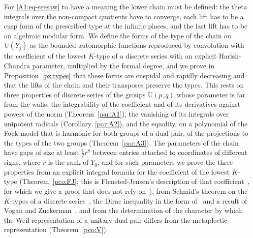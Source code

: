 \documentclass[10pt]{amsart}
\theoremstyle{definition}
\theoremstyle{remark}
\providecommand{\auU}{\mathrm U}
\begin{document}
For \eqref{A1:eq-seesaw} to have a meaning the lower chain must be defined: the theta integrals
over the non-compact quotients have to converge, each lift has to be a cusp form of the prescribed
type at the infinite places, and the last lift has to be an algebraic modular form. We define the
forms of the type of the chain on $\auU(Y_j)$ as the bounded automorphic functions reproduced by
convolution with the coefficient of the lowest $K$-type of a discrete series with an explicit
Harish-Chandra parameter, multiplied by the formal degree, and we prove in
Proposition~\ref{pz:types} that these forms are cuspidal and rapidly decreasing and that the
lifts of the chain and their transposes preserve the types. This rests on three properties of
discrete series of the groups $\auU(p,q)$ whose parameter is far from the walls: the integrability
of the coefficient and of its derivatives against powers of the norm (Theorem~\ref{par:A1}), the
vanishing of its integrals over unipotent radicals (Corollary~\ref{par:A2}), and the equality, on
a polynomial of the Fock model that is harmonic for both groups of a dual pair, of the projections
to the types of the two groups (Theorem~\ref{par:A3}). The parameters of the chain have gaps of size at least $\tfrac12r^8$
between entries attached to coordinates of different signs, where $r$ is the rank of $Y_0$, and
for such parameters we prove the three properties from an explicit integral formula for the
coefficient of the lowest $K$-type (Theorem~\ref{pco:FJ}; this is Flensted-Jensen's description
of that coefficient~\cite{FJ}, for which we give a proof that does not rely on~\cite{FJ}), from
Schmid's theorem on the $K$-types of a discrete
series~\cite{Schmid75}, the Dirac inequality in the form of~\cite{HuangPandzic} and a result of
Vogan and Zuckerman~\cite{VoganZuckerman}, and from the determination of the character by which
the Weil representation of a unitary dual pair differs from the metaplectic representation
(Theorem~\ref{pco:V}).
\end{document}
